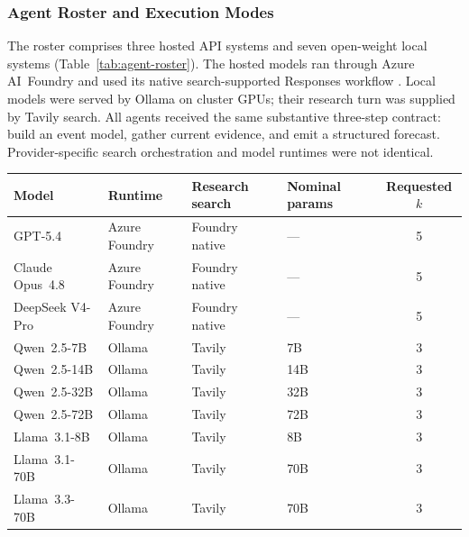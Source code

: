 \subsubsection{Agent Roster and Execution Modes}
\label{app:agent-roster}

The roster comprises three hosted API systems and seven open-weight local systems
(Table~\ref{tab:agent-roster}).  The hosted models ran through Azure AI~Foundry and used
its native search-supported Responses workflow \citep{microsoft2026foundry}.  Local
models were served by Ollama \citep{ollama2026} on cluster GPUs; their research turn was supplied by Tavily search.  All agents received the same substantive three-step contract: build an event
model, gather current evidence, and emit a structured forecast. Provider-specific
search orchestration and model runtimes were not identical.

\begin{center}
\begin{minipage}{\linewidth}
\centering
{}
\label{tab:agent-roster}
\small
\begin{tabular}{llllc}
\toprule
\textbf{Model} & \textbf{Runtime} & \textbf{Research search} &
\textbf{Nominal params} & \textbf{Requested $k$} \\
\midrule
GPT-5.4          & Azure Foundry & Foundry native & --- & 5 \\
Claude Opus~4.8  & Azure Foundry & Foundry native & --- & 5 \\
DeepSeek V4-Pro  & Azure Foundry & Foundry native & --- & 5 \\
Qwen~2.5-7B      & Ollama & Tavily & 7B  & 3 \\
Qwen~2.5-14B     & Ollama & Tavily & 14B & 3 \\
Qwen~2.5-32B     & Ollama & Tavily & 32B & 3 \\
Qwen~2.5-72B     & Ollama & Tavily & 72B & 3 \\
Llama~3.1-8B     & Ollama & Tavily & 8B  & 3 \\
Llama~3.1-70B    & Ollama & Tavily & 70B & 3 \\
Llama~3.3-70B    & Ollama & Tavily & 70B & 3 \\
\bottomrule
\end{tabular}
\end{minipage}
\end{center}

